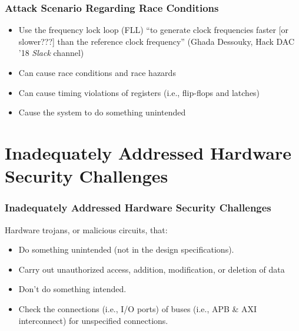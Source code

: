 \documentclass[xcolor={usenames,dvipsnames},hyperref={hyperindex,bookmarks}]{beamer}
\begin{document}



\frame
{
	\frametitle{Attack Scenario Regarding Race Conditions}

	\begin{itemize}
	\item Use the frequency lock loop (FLL) ``to generate clock frequencies faster [or slower???] than the reference clock frequency'' (Ghada Dessouky, Hack DAC '18 {\it Slack} channel)
	\item Can cause race conditions and race hazards
	\item Can cause timing violations of registers (i.e., flip-flops and latches)
	\item Cause the system to do something unintended
	\end{itemize}
}





\section{Inadequately Addressed Hardware Security Challenges}

\frame
{
	\frametitle{Inadequately Addressed Hardware Security Challenges}

	Hardware trojans, or malicious circuits, that:
	\begin{itemize}
	\item Do something unintended (not in the design specifications).
	\item Carry out unauthorized access, addition, modification, or deletion of data
	\item Don't do something intended.
	\item Check the connections (i.e., I/O ports) of buses (i.e., APB \& AXI interconnect) for unspecified connections.
	\end{itemize}
}
\end{document}
